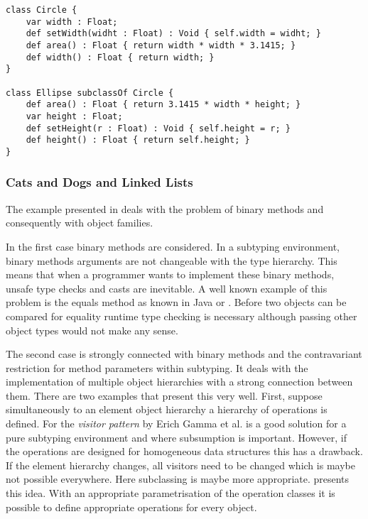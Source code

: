 \begin{lstlisting}[float=ht,language=ooplss,caption=Circle-Ellipse problem in \ooplss,label=lst:ellipseCircleOoplss]
class Circle {
	var width : Float;
	def setWidth(widht : Float) : Void { self.width = widht; }
	def area() : Float { return width * width * 3.1415; }
	def width() : Float { return width; }
}

class Ellipse subclassOf Circle {
	def area() : Float { return 3.1415 * width * height; }
	var height : Float;
	def setHeight(r : Float) : Void { self.height = r; }
	def height() : Float { return self.height; }
}
\end{lstlisting}

\subsubsection{Cats and Dogs and Linked Lists}
The example presented in  deals with the
problem of binary methods and consequently with object families.

In the first case binary methods are considered. In a subtyping environment,
binary methods arguments are not changeable with the type hierarchy. This
means that when a programmer wants to implement these binary methods,
unsafe type checks and casts are inevitable. A well known example of this problem is the
equals method as known in Java or \cs. Before two objects can be compared
for equality runtime type checking is necessary although passing other
object types would not make any sense.

The second case is strongly connected with binary methods and the contravariant
restriction for method parameters within subtyping. It deals with the implementation of multiple
object hierarchies with a strong connection between them. There are two
examples that present this very well. First, suppose simultaneously to
an element object hierarchy a hierarchy of operations is defined. For
the \emph{visitor pattern} by Erich Gamma et al. \cite{gamma_design_1995}
is a good solution for a pure subtyping environment and where subsumption
is important. However, if the operations are designed for homogeneous
data structures this has a drawback. If the element hierarchy changes, all
visitors need to be changed which is maybe not possible everywhere. Here
subclassing is maybe more appropriate. 
presents this idea. With an appropriate parametrisation of the operation
classes it is possible to define appropriate operations for every object.

